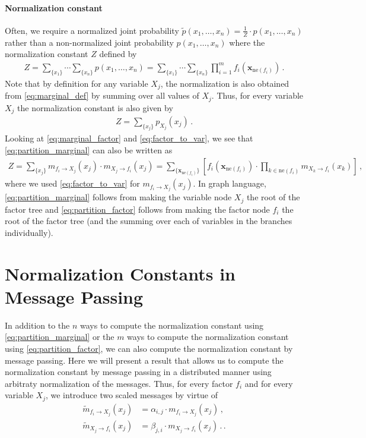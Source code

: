 \documentclass[a4paper]{article}
\newcommand{\bs}[1]{\boldsymbol{#1}}
\newcommand{\neighbours}[1]{{\mathrm{ne} \left( {#1} \right)}}
\theoremstyle{definition}
\begin{document}
\paragraph{Normalization constant} Often, we require a normalized joint probability $\widetilde{p}(x_1,\ldots,x_n) = \frac{1}{Z} \cdot p(x_1,\ldots,x_n)$ rather than a non-normalized joint probability $p(x_1,\ldots,x_n)$ where the normalization constant $Z$ defined by
\begin{align}
    Z = \sum_{\{x_1\}} \cdots \sum_{\{x_n\}} p(x_1,\ldots,x_n) = \sum_{\{x_1\}} \cdots \sum_{\{x_n\}} \prod_{i=1}^m f_i(\bs{x}_{\neighbours{f_i}}) \,. \label{eq:partition}
\end{align}
Note that by definition for any variable $X_j$, the normalization is also obtained from \eqref{eq:marginal_def} by summing over all values of $X_j$. Thus, for every variable $X_j$ the normalization constant is also given by
\begin{align}
    Z = \sum_{\{x_j\}} p_{X_j}(x_j) \,. \label{eq:partition_marginal}
\end{align}
Looking at \eqref{eq:marginal_factor} and \eqref{eq:factor_to_var}, we see that \eqref{eq:partition_marginal} can also be written as
\begin{align}
    Z = \sum_{\{x_j\}} m_{f_i \to X_j}(x_j) \cdot m_{X_j \to f_i}(x_j) = \sum_{\{\bs{x}_{\neighbours{f_i}}\}} \left[ f_i(\bs{x}_{\neighbours{f_i}}) \cdot \prod_{k \in \neighbours{f_i}} m_{X_k \to f_i}(x_k) \right] \,, \label{eq:partition_factor}
\end{align}
where we used \eqref{eq:factor_to_var} for $m_{f_i \to X_j}(x_j)$. In graph language, \eqref{eq:partition_marginal} follows from making the variable node $X_j$ the root of the factor tree and \eqref{eq:partition_factor} follows from making the factor node $f_i$ the root of the factor tree (and the summing over each of variables in the branches individually).

\section*{Normalization Constants in Message Passing}
In addition to the $n$ ways to compute the normalization constant using \eqref{eq:partition_marginal} or the $m$ ways to compute the normalization constant using \eqref{eq:partition_factor}, we can also compute the normalization constant by message passing. Here we will present a result that allows us to compute the normalization constant by message passing in a distributed manner using arbitraty normalization of the messages. Thus, for every factor $f_i$ and for every variable $X_j$, we introduce two scaled messages by virtue of 
\begin{align}
    \widetilde{m}_{f_i \to X_j}(x_j) &= \alpha_{i,j} \cdot m_{f_i \to X_j}(x_j) \,, \label{eq:factor_to_var_scaled} \\
    \widetilde{m}_{X_j \to f_i}(x_j) &= \beta_{j,i} \cdot m_{X_j \to f_i}(x_j) \,. \label{eq:var_to_factor_scaled} \,.
\end{align}
\end{document}
